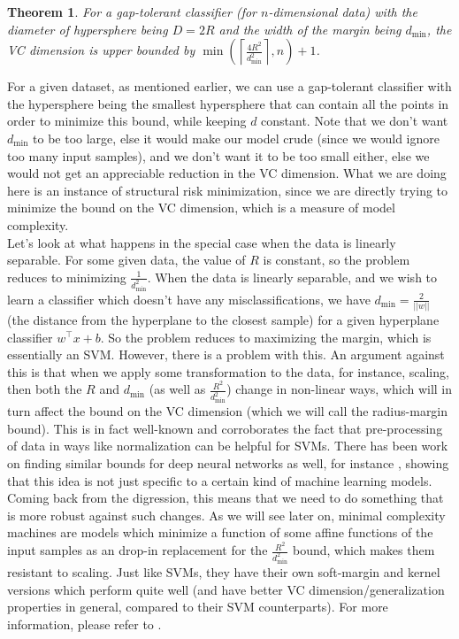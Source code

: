 \documentclass[11pt]{article}
\newcommand{\nl}{\vspace*{0.3cm}\\}
\newtheorem{theorem}{Theorem}[section]
\begin{document}
\begin{theorem}
    For a gap-tolerant classifier (for $n$-dimensional data) with the diameter of hypersphere being $D = 2R$ and the width of the margin being $d_{\min}$, the VC dimension is upper bounded by
    $\min\left(\left\lceil\frac{4R^2}{d_{\min}^2}\right\rceil,
        n\right) + 1$.
\end{theorem}
For a given dataset, as mentioned earlier, we can use a gap-tolerant classifier with the hypersphere being the smallest hypersphere that can contain all the points in order to minimize this
bound, while keeping $d$ constant. Note that we don't want $d_{\min}$ to be too large, else it would make our model crude (since we would ignore too many input samples), and we don't want
it to be too small either, else we would not get an appreciable reduction in the VC dimension. What we are doing here is an instance of structural risk minimization, since we are directly trying
to minimize the bound on the VC dimension, which is a measure of model complexity.\nl
Let's look at what happens in the special case when the data is linearly separable. For some given data, the value of $R$ is constant, so the problem reduces to minimizing
$\frac{1}{d_{\min}^2}$. When the data is linearly separable, and we wish to learn a classifier which doesn't have any misclassifications, we have $d_{\min} = \frac{2}{||w||}$ (the
distance from the hyperplane to the closest sample) for a given
hyperplane classifier $w^\intercal x + b$. So the problem reduces to maximizing the margin, which is essentially an SVM. However, there is a problem with this. An argument against this is
that when we apply some transformation to the data, for instance, scaling, then both the $R$ and $d_{\min}$ (as well as $\frac{R^2}{d_{\min}^2}$) change in non-linear ways, which will in turn affect
the bound on the VC dimension (which we will call the radius-margin bound).
This is in fact well-known and corroborates the fact that pre-processing of data in ways like normalization can be helpful for SVMs. There has been work on finding similar bounds for deep
neural networks as well, for instance \cite{sharma}, showing that this idea is not just specific to a certain kind of machine learning models.\nl
Coming back from the digression, this means that we need to do something that is more robust against such changes. As we will see later on, minimal complexity machines are models which minimize
a function of some affine functions of the input samples as an drop-in replacement for the $\frac{R^2}{d_{\min}^2}$ bound, which makes them resistant to scaling. Just like SVMs, they have their
own soft-margin and kernel versions which perform quite well (and have better VC dimension/generalization properties in general, compared to their SVM counterparts). For more information, please refer to \cite{jayadeva}.
\end{document}
